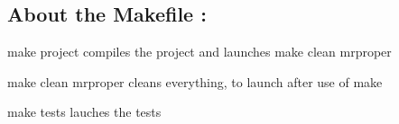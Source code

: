 \subsection*{About the Makefile \+:}


\begin{DoxyItemize}
\item {\ttfamily make project} compiles the project and launches {\ttfamily make clean mrproper}
\item {\ttfamily make clean mrproper} cleans everything, to launch after use of {\ttfamily make}
\item {\ttfamily make tests} lauches the tests 
\end{DoxyItemize}